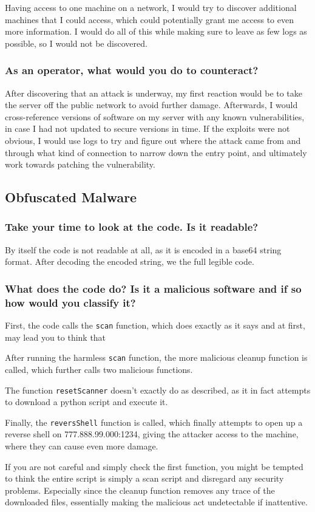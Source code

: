 Having access to one machine on a network, I would try to discover additional machines that I could access, which could potentially grant me access to even more information. I would do all of this while making sure to leave as few logs as possible, so I would not be discovered.

\subsubsection{As an operator, what would you do to counteract?}
After discovering that an attack is underway, my first reaction would be to take the server off the public network to avoid further damage. Afterwards, I would cross-reference versions of software on my server with any known vulnerabilities, in case I had not updated to secure versions in time. If the exploits were not obvious, I would use logs to try and figure out where the attack came from and through what kind of connection to narrow down the entry point, and ultimately work towards patching the vulnerability.

\subsection{Obfuscated Malware}
\subsubsection{Take your time to look at the code. Is it readable?}
By itself the code is not readable at all, as it is encoded in a base64 string format. After decoding the encoded string, we the full legible code.

\subsubsection{What does the code do? Is it a malicious software and if so how would you classify it?}
First, the code calls the \texttt{scan} function, which does exactly as it says and at first, may lead you to think that \vfill

After running the harmless \texttt{scan} function, the more malicious cleanup function is called, which further calls two malicious functions.

The function \texttt{resetScanner} doesn't exactly do as described, as it in fact attempts to download a python script and execute it.

Finally, the \texttt{reversShell} function is called, which finally attempts to open up a reverse shell on 777.888.99.000:1234, giving the attacker access to the machine, where they can cause even more damage.



If you are not careful and simply check the first function, you might be tempted to think the entire script is simply a scan script and disregard any security problems. Especially since the cleanup function removes any trace of the downloaded files, essentially making the malicious act undetectable if inattentive.